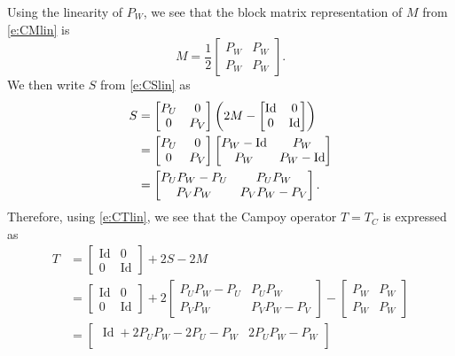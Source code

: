 \documentclass[11pt]{article}
\newcommand{\Id}{\ensuremath{\operatorname{Id}}}
\theoremstyle{definition}
\DeclarePairedDelimiter{\parens}{\lparen}{\rparen}
\providecommand{\Id}{\operatorname{{ Id}}}
\providecommand{\Id}{\operatorname{Id}}
\begin{document}
{Using the linearity of $P_W$, we see that 
the block matrix representation of $M$ from \cref{e:CMlin} is 
\begin{equation}\label{e:CMmat}
M=\frac12\begin{bmatrix}
P_W&P_W\\P_W&P_W
\end{bmatrix}. 
\end{equation}
We then write $S$ from \cref{e:CSlin} as
\begin{align*}
S&=\begin{bmatrix}
P_U&0\\
0&P_V
\end{bmatrix}\parens*{2M
-\begin{bmatrix}
\Id&0\\0&\Id
\end{bmatrix}}\\
&=\begin{bmatrix}
P_U&0\\
0&P_V
\end{bmatrix}{\begin{bmatrix}
P_W-\Id&P_W\\P_W&P_W-\Id
\end{bmatrix}}\\
&=\begin{bmatrix}
P_UP_W-P_U&P_UP_W\\P_VP_W&P_VP_W-P_V
\end{bmatrix}. 
\end{align*}
Therefore, using \cref{e:CTlin}, we see that 
the Campoy operator $T=T_C$ is expressed as 
\begin{subequations}
\label{e:220526c}
\begin{align}
T 
&=\begin{bmatrix}
\Id&0\\0&\Id\end{bmatrix}
+2S 
-2M\\
&= \begin{bmatrix}
\Id&0\\0&\Id\end{bmatrix}
+ 2\begin{bmatrix}
P_UP_W-P_U&P_UP_W\\P_VP_W&P_VP_W-P_V
\end{bmatrix}
- \begin{bmatrix}P_W & P_W\\P_W & P_W\end{bmatrix}
\\
&=\begin{bmatrix}
\Id+2P_UP_W-2P_U - P_W& 2P_UP_W-P_W\\

\end{bmatrix}
\end{align}
\end{subequations}}
\end{document}
